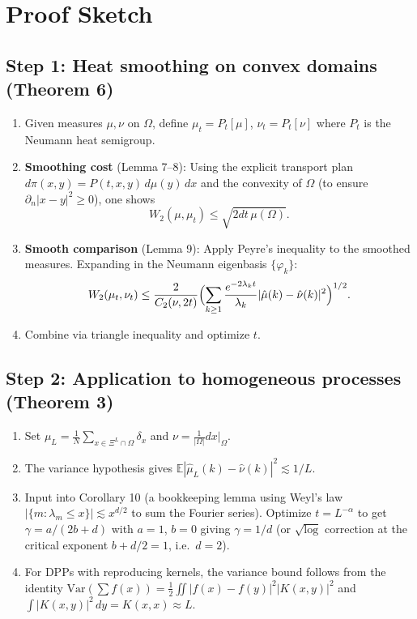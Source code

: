 \documentclass[11pt,a4paper]{article}
\theoremstyle{definition}
\begin{document}
\section{Proof Sketch}

\subsection*{Step 1: Heat smoothing on convex domains (Theorem 6)}

\begin{enumerate}[nosep]
  \item Given measures $\mu,\nu$ on $\Omega$, define $\mu_t = P_t[\mu]$, $\nu_t=P_t[\nu]$ where $P_t$ is the Neumann heat semigroup.
  \item \textbf{Smoothing cost} (Lemma 7--8): Using the explicit transport plan $d\pi(x,y)=P(t,x,y)\,d\mu(y)\,dx$ and the convexity of $\Omega$ (to ensure $\partial_n|x-y|^2\ge 0$), one shows
  \[
    W_2(\mu,\mu_t) \le \sqrt{2dt\,\mu(\Omega)}.
  \]
  \item \textbf{Smooth comparison} (Lemma 9): Apply Peyre's inequality to the smoothed measures. Expanding in the Neumann eigenbasis $\{\varphi_k\}$:
  \[
    W_2(\mu_t,\nu_t) \le \frac{2}{C_2(\nu,2t)}\Bigl(\sum_{k\ge 1}\frac{e^{-2\lambda_k t}}{\lambda_k}|\hat\mu(k)-\hat\nu(k)|^2\Bigr)^{1/2}.
  \]
  \item Combine via triangle inequality and optimize $t$.
\end{enumerate}

\subsection*{Step 2: Application to homogeneous processes (Theorem 3)}

\begin{enumerate}[nosep]
  \item Set $\mu_L = \frac{1}{N}\sum_{x\in\Xi^L\cap\Omega}\delta_x$ and $\nu=\frac{1}{|\Omega|}dx|_\Omega$.
  \item The variance hypothesis gives $\mathbb{E}|\hat\mu_L(k)-\hat\nu(k)|^2 \lesssim 1/L$.
  \item Input into Corollary 10 (a bookkeeping lemma using Weyl's law $|\{m:\lambda_m\le x\}|\lesssim x^{d/2}$ to sum the Fourier series). Optimize $t=L^{-\alpha}$ to get $\gamma = a/(2b+d)$ with $a=1$, $b=0$ giving $\gamma=1/d$ (or $\sqrt{\log}$ correction at the critical exponent $b+d/2=1$, i.e.\ $d=2$).
  \item For DPPs with reproducing kernels, the variance bound follows from the identity $\mathrm{Var}(\sum f(x))=\frac{1}{2}\iint|f(x)-f(y)|^2|K(x,y)|^2$ and $\int|K(x,y)|^2\,dy = K(x,x)\approx L$.
\end{enumerate}
\end{document}
